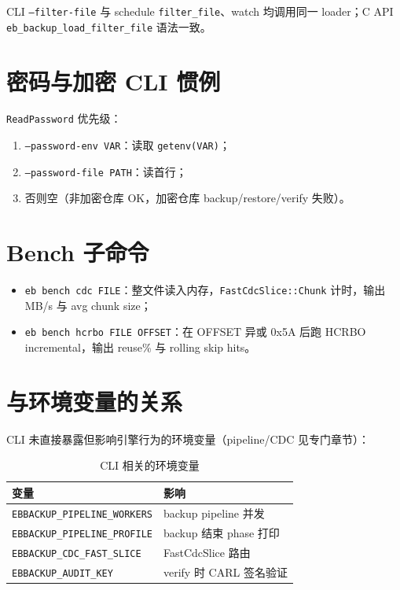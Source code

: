 CLI \texttt{--filter-file} 与 schedule \texttt{filter\_file}、watch 均调用同一 loader；C API \texttt{eb\_backup\_load\_filter\_file} 语法一致。

\section{密码与加密 CLI 惯例}

\texttt{ReadPassword} 优先级：
\begin{enumerate}
  \item \texttt{--password-env VAR}：读取 \texttt{getenv(VAR)}；
  \item \texttt{--password-file PATH}：读首行；
  \item 否则空（非加密仓库 OK，加密仓库 backup/restore/verify 失败）。
\end{enumerate}

\section{Bench 子命令}

\begin{itemize}[nosep]
  \item \texttt{eb bench cdc FILE}：整文件读入内存，\texttt{FastCdcSlice::Chunk} 计时，输出 MB/s 与 avg chunk size；
  \item \texttt{eb bench hcrbo FILE OFFSET}：在 OFFSET 异或 0x5A 后跑 HCRBO incremental，输出 reuse\% 与 rolling skip hits。
\end{itemize}

\section{与环境变量的关系}

CLI 未直接暴露但影响引擎行为的环境变量（pipeline/CDC 见专门章节）：

\begin{table}[htbp]
\centering
\caption{CLI 相关的环境变量}
\small
\begin{tabular}{@{}ll@{}}
\toprule
变量 & 影响 \\
\midrule
\texttt{EBBACKUP\_PIPELINE\_WORKERS} & backup pipeline 并发 \\
\texttt{EBBACKUP\_PIPELINE\_PROFILE} & backup 结束 phase 打印 \\
\texttt{EBBACKUP\_CDC\_FAST\_SLICE} & FastCdcSlice 路由 \\
\texttt{EBBACKUP\_AUDIT\_KEY} & verify 时 CARL 签名验证 \\
\bottomrule
\end{tabular}
\end{table}

